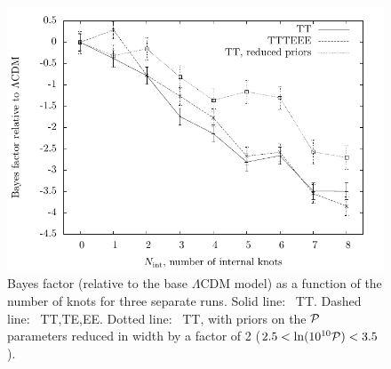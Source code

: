 \begin{figure}
\includegraphics[width=\textwidth]{chapter_pps_reconstruction/figures/Bayes_PR}
  \caption{
    Bayes factor (relative to the base $\Lambda$CDM model) as a function of the number of knots
for three separate runs. Solid line: \Planck\ TT. Dashed line: \Planck\ TT,TE,EE. Dotted line:
\Planck\ TT, with priors on the $\mathcal{P}$ parameters reduced in width by a factor of 2 ($2.5<\ln(10^{10}\mathcal{P})<3.5$).
\label{fig:Bayes_Factors}
}
\end{figure}

